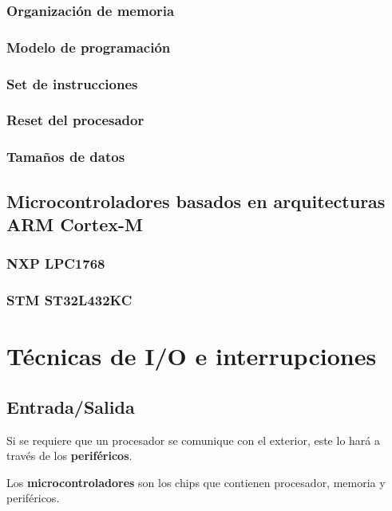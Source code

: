\documentclass[a4paper]{book}
\begin{document}
\subsection{Organización de memoria}

\subsection{Modelo de programación}

\subsection{Set de instrucciones}

\subsection{Reset del procesador}

\subsection{Tamaños de datos}

\section{Microcontroladores basados en arquitecturas ARM Cortex-M}

\subsection{NXP LPC1768}

\subsection{STM ST32L432KC}

\chapter{Técnicas de I/O e interrupciones}

\section{Entrada/Salida}

Si se requiere que un procesador se comunique con el exterior, este lo hará a través de los \textbf{periféricos}.

Los \textbf{microcontroladores} son los chips que contienen procesador, memoria y periféricos.
\end{document}

